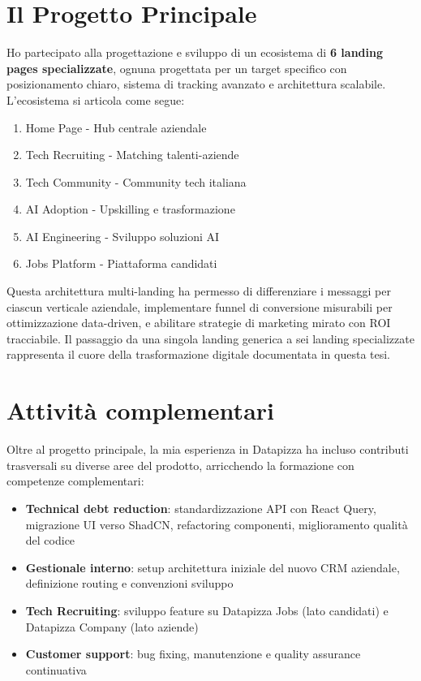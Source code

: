 \documentclass[12pt,a4paper,openright,twoside]{book}
\begin{document}
\section*{Il Progetto Principale}
Ho partecipato alla progettazione e sviluppo di un ecosistema di 
\textbf{6 landing pages specializzate}, ognuna progettata per un target 
specifico con posizionamento chiaro, sistema di tracking avanzato e 
architettura scalabile. L'ecosistema si articola come segue:

\begin{enumerate}
  \item Home Page - Hub centrale aziendale
  \item Tech Recruiting - Matching talenti-aziende
  \item Tech Community - Community tech italiana
  \item AI Adoption - Upskilling e trasformazione
  \item AI Engineering - Sviluppo soluzioni AI
  \item Jobs Platform - Piattaforma candidati
\end{enumerate}

Questa architettura multi-landing ha permesso di differenziare i messaggi per 
ciascun verticale aziendale, implementare funnel di conversione misurabili per 
ottimizzazione data-driven, e abilitare strategie di marketing mirato con ROI 
tracciabile. Il passaggio da una singola landing generica a sei landing 
specializzate rappresenta il cuore della trasformazione digitale documentata 
in questa tesi.

\section*{Attività complementari}
Oltre al progetto principale, la mia esperienza in Datapizza ha incluso 
contributi trasversali su diverse aree del prodotto, arricchendo la formazione 
con competenze complementari:

\begin{itemize}
  \item \textbf{Technical debt reduction}: standardizzazione API con 
        React Query, migrazione UI verso ShadCN, refactoring componenti, 
        miglioramento qualità del codice 
  \item \textbf{Gestionale interno}: setup architettura iniziale del 
        nuovo CRM aziendale, definizione routing e convenzioni sviluppo
  \item \textbf{Tech Recruiting}: sviluppo feature su Datapizza Jobs 
        (lato candidati) e Datapizza Company (lato aziende)
  \item \textbf{Customer support}: bug fixing, manutenzione e quality 
        assurance continuativa
\end{itemize}
\end{document}
